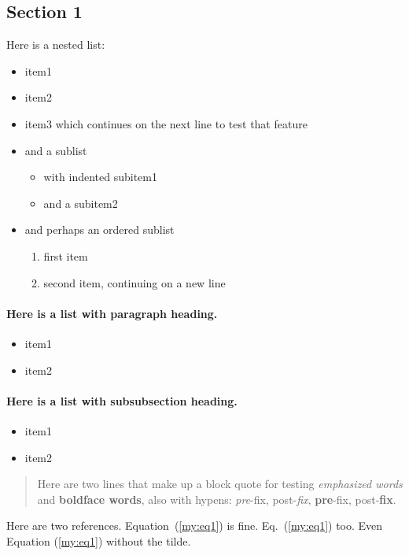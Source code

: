 \documentclass[%
oneside,                 %
final,                   %
10pt]{article}
\theoremstyle{definition}
\begin{document}
\subsection{Section 1}
\label{sec1}
Here is a nested list:
\begin{itemize}
  \item item1
  \item item2
  \item item3 which continues on the next line to test that feature
  \item and a sublist
\begin{itemize}
    \item with indented subitem1
    \item and a subitem2
\end{itemize}
\noindent
  \item and perhaps an ordered sublist
\begin{enumerate}
   \item first item
   \item second item, continuing on a new line
\end{enumerate}
\noindent
\end{itemize}
\noindent
\paragraph{Here is a list with paragraph heading.}
\begin{itemize}
  \item item1
  \item item2
\end{itemize}
\noindent
\paragraph{Here is a list with subsubsection heading.}
\begin{itemize}
  \item item1
  \item item2
\end{itemize}
\noindent

\begin{quote}
Here are two lines that make up
a block quote for testing \emph{emphasized words} and \textbf{boldface words},
also with hypens:
\emph{pre}-fix, post-\emph{fix}, \textbf{pre}-fix, post-\textbf{fix}.
\end{quote}

Here are two references. Equation~(\ref{my:eq1}) is fine. Eq.~(\ref{my:eq1}) too.
Even Equation (\ref{my:eq1}) without the tilde.
\end{document}
